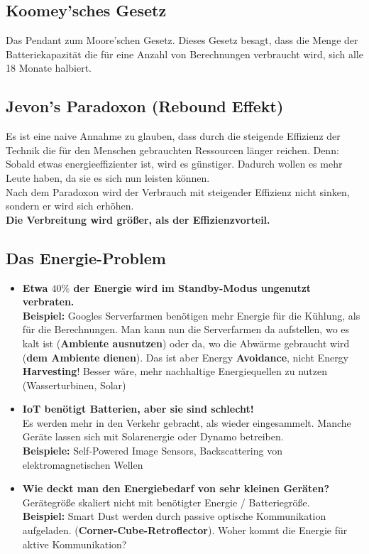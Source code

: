 \documentclass[a4paper]{article}
\begin{document}
\subsection{Koomey'sches Gesetz}
Das Pendant zum Moore'schen Gesetz. Dieses Gesetz besagt, dass die Menge der Batteriekapazität die für eine Anzahl von Berechnungen verbraucht wird, sich alle 18 Monate halbiert.

\subsection{Jevon's Paradoxon (Rebound Effekt)}
Es ist eine naive Annahme zu glauben, dass durch die steigende Effizienz der Technik die für den Menschen gebrauchten Ressourcen länger reichen. Denn: Sobald etwas energieeffizienter ist, wird es günstiger. Dadurch wollen es mehr Leute haben, da sie es sich nun leisten können.\\

Nach dem Paradoxon wird der Verbrauch mit steigender Effizienz nicht sinken, sondern er wird sich erhöhen. \\
\textbf{Die Verbreitung wird größer, als der Effizienzvorteil.}

\subsection{Das Energie-Problem}
\begin{itemize}
	\item \textbf{Etwa $40\%$ der Energie wird im Standby-Modus ungenutzt verbraten.}\\
	\textbf{Beispiel:} Googles Serverfarmen benötigen mehr Energie für die Kühlung, als für die Berechnungen. Man kann nun die Serverfarmen da aufstellen, wo es kalt ist (\textbf{Ambiente ausnutzen}) oder da, wo die Abwärme gebraucht wird (\textbf{dem Ambiente dienen}). Das ist aber Energy \textbf{Avoidance}, nicht Energy \textbf{Harvesting}! Besser wäre, mehr nachhaltige Energiequellen zu nutzen (Wasserturbinen, Solar)\newpage
	\item \textbf{IoT benötigt Batterien, aber sie sind schlecht!}\\ Es werden mehr in den Verkehr gebracht, als wieder eingesammelt. Manche Geräte lassen sich mit Solarenergie oder Dynamo betreiben. \\
	\textbf{Beispiele:} Self-Powered Image Sensors, Backscattering von elektromagnetischen Wellen
	\item \textbf{Wie deckt man den Energiebedarf von sehr kleinen Geräten?}\\
	Gerätegröße skaliert nicht mit benötigter Energie / Batteriegröße.\\
	\textbf{Beispiel:} Smart Dust werden durch passive optische Kommunikation aufgeladen. (\textbf{Corner-Cube-Retroflector}). Woher kommt die Energie für aktive Kommunikation?
\end{itemize}
\end{document}

